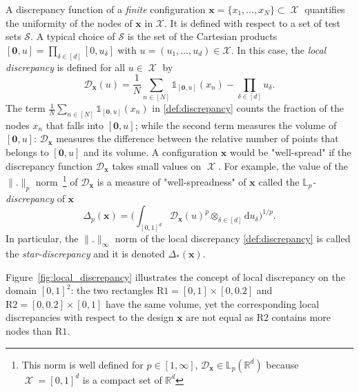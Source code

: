\documentclass[twoside,11pt]{book}
\numberwithin{theorem}{chapter}
\numberwithin{definition}{chapter}
\numberwithin{proposition}{chapter}
\numberwithin{corollary}{chapter}
\numberwithin{example}{chapter}
\numberwithin{lemma}{chapter}
\numberwithin{assumption}{chapter}
\numberwithin{equation}{chapter}
\numberwithin{figure}{chapter}
\DeclareMathOperator{\X}{\mathcal{X}}
\begin{document}
 A discrepancy function of a \emph{finite} configuration $\bm{x} = \{x_{1}, \dots, x_{N} \} \subset \X$ quantifies the uniformity of the nodes of $\bm{x}$ in $\mathcal{X}$. It is  defined with respect to a set of test sets $\mathcal{S}$. A typical choice of $\mathcal{S}$ is the set of the Cartesian products $[\bm{0},u] = \prod_{\delta \in [d]}[0,u_{\delta}]$ with $u = (u_{1}, \dots, u_{d}) \in \mathcal{X}$. In this case, the \emph{local discrepancy} is defined for all $u \in \X$ by 
\begin{equation}\label{def:discrepancy}
\mathcal{D}_{\bm{x}}(u) = \frac{1}{N}\sum\limits_{n \in [N]} \mathbb{1}_{[\bm{0},u]}(x_{n}) - \prod\limits_{\delta \in [d]}u_{\delta}.
\end{equation}  
The term $\frac{1}{N}\sum_{n \in [N]} \mathbb{1}_{[\bm{0},u]}(x_{n})$ in \eqref{def:discrepancy} counts the fraction of the nodes $x_{n}$ that falls into $[\bm{0},u]$; while the second term measures the volume of $[\bm{0},u]$: $\mathcal{D}_{\bm{x}}$ measures the difference between the relative number of points that belongs to $[\bm{0},u]$ and its volume. A configuration $\bm{x}$ would be "well-spread" if the discrepancy function $\mathcal{D}_{\bm{x}}$ takes small values on $\X$. For example, the value of the $\|.\|_{p}$ norm~\footnote{This norm is well defined for $p \in [1,\infty]$, $\mathcal{D}_{\bm{x}} \in \mathbb{L}_{p}(\mathbb{R}^{d})$ because $\X = [0,1]^{d}$ is a compact set of $\mathbb{R}^{d}$} of $\mathcal{D}_{\bm{x}}$ is a measure of "well-spreadness" of $\bm{x}$ called the \emph{$\mathbb{L}_{p}$-discrepancy} of $\bm{x}$
\begin{equation}
\Delta_{p}(\bm{x}) = \bigg(\int_{[0,1]^{d}}\mathcal{D}_{\bm{x}}(u)^{p} \otimes_{\delta \in [d]} \mathrm{d}u_{\delta}\bigg)^{1/p}.
\end{equation}
In particular, the $\|.\|_{\infty}$ norm of the local discrepancy \eqref{def:discrepancy} is called the \emph{star-discrepancy} and it is denoted $\Delta_{*}(\bm{x})$.

Figure~\ref{fig:local_discrepancy} illustrates the concept of local discrepancy on the domain $[0,1]^{2}$: the two rectangles $\mathrm{R1} = [0,1] \times [0,0.2]$ and $\mathrm{R2} = [0,0.2] \times [0,1]$ have the same volume, yet the corresponding local discrepancies with respect to the design $\bm{x}$ are not equal as $\mathrm{R2}$ contains more nodes than $\mathrm{R1}$.


\end{document}
